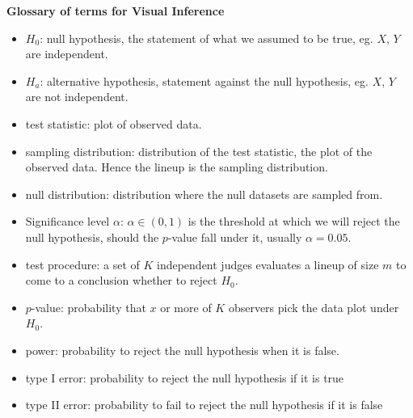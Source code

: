 \documentclass[12]{report}
\begin{document}
\centerline{\bf\large Glossary of terms for Visual Inference}

\begin{itemize}
\item $H_0$: null hypothesis, the statement of what we assumed to be true, eg. $X$, $Y$ are independent. \\
\item $H_a$:  alternative hypothesis, statement against the null hypothesis, eg. $X$, $Y$ are not independent. \\
\item test statistic:  plot of observed data.  \\
\item sampling distribution:  distribution of the test statistic, the plot of the observed data. Hence the lineup is the sampling distribution.\\
\item null distribution: distribution where the null datasets are sampled from.\\
\item Significance level $\alpha$:  $\alpha \in (0,1)$ is the threshold at which we will reject the null hypothesis, should the $p$-value fall under it, usually $\alpha=0.05$.\\
\item test procedure:  a set of $K$ independent judges evaluates a lineup of size $m$ to come to a conclusion whether to reject $H_0$.\\
\item $p$-value:  probability that $x$ or more of $K$ observers pick the data plot under $H_0$. \\
\item power:  probability to reject the null hypothesis when it is false.\\
\item type I error:  probability to reject the null hypothesis if it is true\\
\item type II error:  probability to fail to reject the null hypothesis if it is false\\


\end{itemize}
\end{document}
